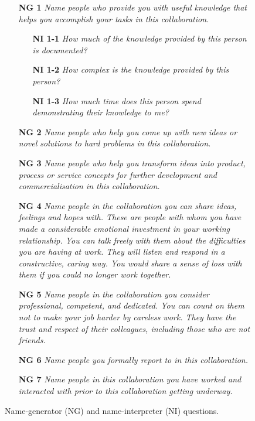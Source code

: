 \begin{figure}[p]
\centering
\label{ng}
\caption[Name-generator/interpreter questions]{Name-generator (NG) and name-interpreter (NI) questions.}
\begin{tcolorbox}
\begin{itemize}
    \item[\textbf{NG 1}] \textit{Name people who provide you with useful knowledge that helps you accomplish your tasks in this collaboration.}
    \begin{itemize}
        \item[\textbf{NI 1-1}] \textit{How much of the knowledge provided by this person is documented?}
        \item[\textbf{NI 1-2}] \textit{How complex is the knowledge provided by this person?}
        \item[\textbf{NI 1-3}] \textit{How much time does this person spend demonstrating their knowledge to me?}
    \end{itemize}
    \item[\textbf{NG 2}] \textit{Name people who help you come up with new ideas or novel solutions to hard problems in this collaboration.}
    \item[\textbf{NG 3}] \textit{Name people who help you transform ideas into product, process or service concepts for further development and commercialisation in this collaboration.}
    \item[\textbf{NG 4}] \textit{Name people in the collaboration you can share ideas, feelings and hopes with. These are people with whom you have made a considerable emotional investment in your working relationship. You can talk freely with them about the difficulties you are having at work. They will listen and respond in a constructive, caring way. You would share a sense of loss with them if you could no longer work together.}
    \item[\textbf{NG 5}] \textit{Name people in the collaboration you consider professional, competent, and dedicated. You can count on them not to make your job harder by careless work. They have the trust and respect of their colleagues, including those who are not friends.} 
    \item[\textbf{NG 6}] \textit{Name people you formally report to in this collaboration.}
    \item[\textbf{NG 7}] \textit{Name people in this collaboration you have worked and interacted with prior to this collaboration getting underway.}
\end{itemize}
\end{tcolorbox}
\end{figure}

